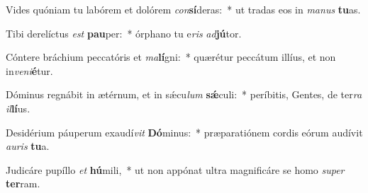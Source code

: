 \item Vides quóniam tu labórem et dolórem \textit{con}\textbf{sí}deras:~* ut tradas eos in \textit{ma}\textit{nus} \textbf{tu}as.
\item Tibi derelíctus \textit{est} \textbf{pau}per:~* órphano tu e\textit{ris} \textit{ad}\textbf{jú}tor.
\item Cóntere bráchium peccatóris et \textit{ma}\textbf{lí}gni:~* quærétur peccátum illíus, et non in\textit{ve}\textit{ni}\textbf{é}tur.
\item Dóminus regnábit in ætérnum, et in sǽcu\textit{lum} \textbf{sǽ}culi:~* períbitis, Gentes, de ter\textit{ra} \textit{il}\textbf{lí}us.
\item Desidérium páuperum exaudí\textit{vit} \textbf{Dó}minus:~* præparatiónem cordis eórum audívit \textit{au}\textit{ris} \textbf{tu}a.
\item Judicáre pupíllo \textit{et} \textbf{hú}mili,~* ut non appónat ultra magnificáre se homo \textit{su}\textit{per} \textbf{ter}ram.
